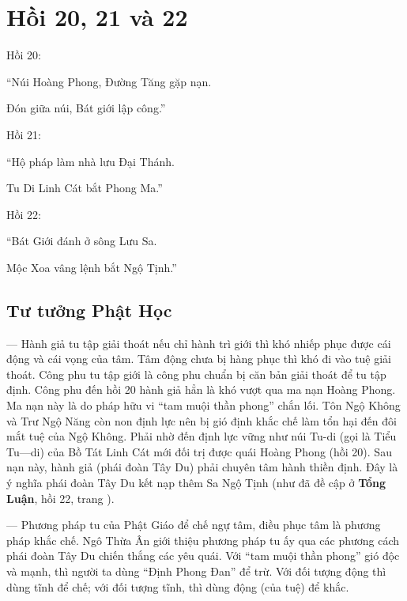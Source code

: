 \chapter{Hồi 20, 21 và 22} %
\label{cha:hoi_20_21_22}

Hồi 20:

\begin{itshape}
``Núi Hoàng Phong, Đường Tăng gặp nạn.

Đón giữa núi, Bát giới lập công.''
\end{itshape}

Hồi 21:

\begin{itshape}
``Hộ pháp làm nhà lưu Đại Thánh.

Tu Di Linh Cát bắt Phong Ma.''
\end{itshape}

Hồi 22:

\begin{itshape}
``Bát Giới đánh ở sông Lưu Sa.

Mộc Xoa vâng lệnh bắt Ngộ Tịnh.''
\end{itshape}

\section{Tư tưởng Phật Học} %
\label{sec:20_21_22_phat_hoc}

— Hành giả tu tập giải thoát nếu chỉ hành trì giới thì khó nhiếp phục được cái động và cái vọng của tâm. Tâm động chưa bị hàng phục thì khó đi vào tuệ giải thoát. Công phu tu tập giới là công phu chuẩn bị căn bản giải thoát để tu tập định. Công phu đến hồi 20 hành giả hẳn là khó vượt qua ma nạn Hoàng Phong. Ma nạn này là do pháp hữu vi ``tam muội thần phong'' chắn lối. Tôn Ngộ Không và Trư Ngộ Năng còn non định lực nên bị gió định khắc chế làm tổn hại đến đôi mắt tuệ của Ngộ Không. Phải nhờ đến định lực vững như núi Tu-di (gọi là Tiểu Tu—di) của Bồ Tát Linh Cát mới đối trị được quái Hoàng Phong (hồi 20). Sau nạn này, hành giả (phái đoàn Tây Du) phải chuyên tâm hành thiền định. Đây là ý nghĩa phái đoàn Tây Du kết nạp thêm Sa Ngộ Tịnh (như đã đề cập ở {\bf Tổng Luận}, hồi 22, trang \pageref{sub:ve_sa_ngo_tinh}).

— Phương pháp tu của Phật Giáo để chế ngự tâm, điều phục tâm là phương pháp khắc chế. Ngô Thừa Ân giới thiệu phương pháp tu ấy qua các phương cách phái đoàn Tây Du chiến thắng các yêu quái. Với ``tam muội thần phong'' gió độc và mạnh, thì người ta dùng ``Định Phong Đan'' để trừ. Với đối tượng động thì dùng tĩnh để chế; với đối tượng tĩnh, thì dùng động (của tuệ) để khắc.

